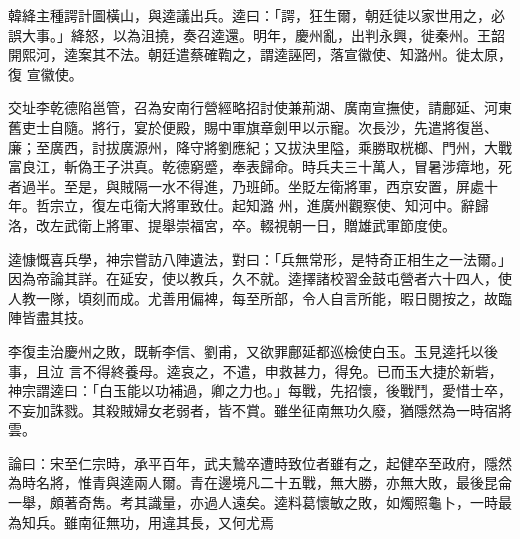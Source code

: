 \begin{pinyinscope}
 韓絳主種諤計圖橫山，與逵議出兵。逵曰：「諤，狂生爾，朝廷徒以家世用之，必誤大事。」絳怒，以為沮撓，奏召逵還。明年，慶州亂，出判永興，徙秦州。王韶開熙河，逵案其不法。朝廷遣蔡確鞫之，謂逵誣罔，落宣徽使、知潞州。徙太原，復
 宣徽使。



 交址李乾德陷邕管，召為安南行營經略招討使兼荊湖、廣南宣撫使，請鄜延、河東舊吏士自隨。將行，宴於便殿，賜中軍旗章劍甲以示寵。次長沙，先遣將復邕、廉；至廣西，討拔廣源州，降守將劉應紀；又拔決里隘，乘勝取桄榔、門州，大戰富良江，斬偽王子洪真。乾德窮蹙，奉表歸命。時兵夫三十萬人，冒暑涉瘴地，死者過半。至是，與賊隔一水不得進，乃班師。坐貶左衛將軍，西京安置，屏處十年。哲宗立，復左屯衛大將軍致仕。起知潞
 州，進廣州觀察使、知河中。辭歸洛，改左武衛上將軍、提舉崇福宮，卒。輟視朝一日，贈雄武軍節度使。



 逵慷慨喜兵學，神宗嘗訪八陣遺法，對曰：「兵無常形，是特奇正相生之一法爾。」因為帝論其詳。在延安，使以教兵，久不就。逵擇諸校習金鼓屯營者六十四人，使人教一隊，頃刻而成。尤善用偏裨，每至所部，令人自言所能，暇日閱按之，故臨陣皆盡其技。



 李復圭治慶州之敗，既斬李信、劉甫，又欲罪鄜延都巡檢使白玉。玉見逵托以後事，且泣
 言不得終養母。逵哀之，不遣，申救甚力，得免。已而玉大捷於新砦，神宗謂逵曰：「白玉能以功補過，卿之力也。」每戰，先招懷，後戰鬥，愛惜士卒，不妄加誅戮。其殺賊婦女老弱者，皆不賞。雖坐征南無功久廢，猶隱然為一時宿將雲。



 論曰：宋至仁宗時，承平百年，武夫鷙卒遭時致位者雖有之，起健卒至政府，隱然為時名將，惟青與逵兩人爾。青在邊境凡二十五戰，無大勝，亦無大敗，最後昆侖
 一舉，頗著奇雋。考其識量，亦過人遠矣。逵料葛懷敏之敗，如燭照龜卜，一時最為知兵。雖南征無功，用違其長，又何尤焉



\end{pinyinscope}